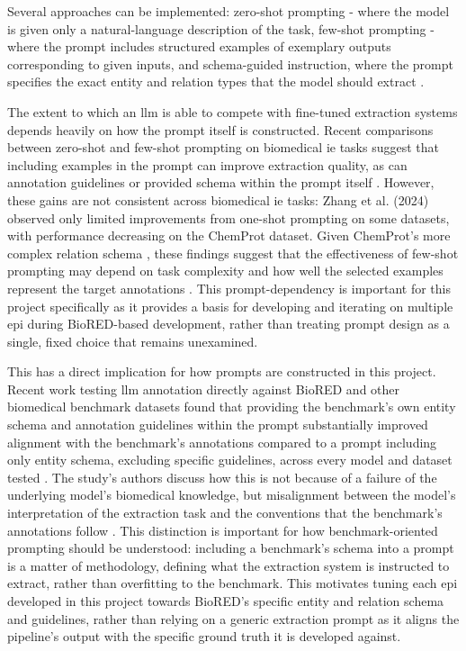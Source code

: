 Several approaches can be implemented: zero-shot prompting - where the model is given only a natural-language description of the task, few-shot prompting - where the prompt includes structured examples of exemplary outputs corresponding to given inputs, and schema-guided instruction, where the prompt specifies the exact entity and relation types that the model should extract \cite{labrak2024zero,ge2026improving,brokman2025benchmark}.

The extent to which an \gls{llm} is able to compete with fine-tuned extraction systems depends heavily on how the prompt itself is constructed. Recent comparisons between zero-shot and few-shot prompting on biomedical \gls{ie} tasks suggest that including examples in the prompt can improve extraction quality, as can annotation guidelines or provided schema within the prompt itself \cite{ge2026improving}. However, these gains are not consistent across biomedical \gls{ie} tasks: Zhang et al. (2024) observed only limited improvements from one-shot prompting on some datasets, with performance decreasing on the ChemProt dataset. Given ChemProt's more complex relation schema \cite{krallinger2017overview}, these findings suggest that the effectiveness of few-shot prompting may depend on task complexity and how well the selected examples represent the target annotations \pref. This prompt-dependency is important for this project specifically as it provides a basis for developing and iterating on multiple \gls{epi} during BioRED-based development, rather than treating prompt design as a single, fixed choice that remains unexamined.

This has a direct implication for how prompts are constructed in this project. Recent work testing \gls{llm} annotation directly against BioRED and other biomedical benchmark datasets found that providing the benchmark's own entity schema and annotation guidelines within the prompt substantially improved alignment with the benchmark's annotations compared to a prompt including only entity schema, excluding specific guidelines, across every model and dataset tested \cite{kim2026refining}. The study's authors discuss how this is not because of a failure of the underlying model's biomedical knowledge, but misalignment between the model's interpretation of the extraction task and the conventions that the benchmark's annotations follow \cite{kim2026refining}. This distinction is important for how benchmark-oriented prompting should be understood: including a benchmark's schema into a prompt is a matter of methodology, defining what the extraction system is instructed to extract, rather than overfitting to the benchmark. This motivates tuning each \gls{epi} developed in this project towards BioRED's specific entity and relation schema and guidelines, rather than relying on a generic extraction prompt as it aligns the pipeline's output with the specific ground truth it is developed against.

